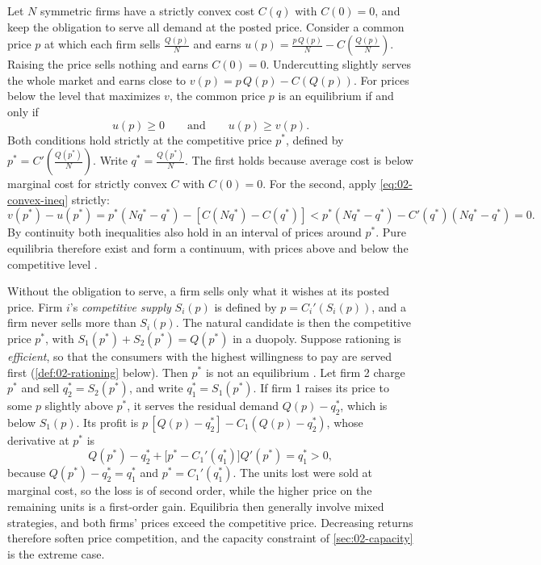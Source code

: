 \begin{remark}\label{rem:02-bertrand-convex}
Let $N$ symmetric firms have a strictly convex cost $C(q)$ with $C(0) = 0$, and keep the obligation to serve all
demand at the posted price. Consider a common price $p$ at which each firm sells $\frac{Q(p)}{N}$ and earns
$u(p) = \frac{p\, Q(p)}{N} - C\left(\frac{Q(p)}{N}\right)$. Raising the price sells nothing and earns $C(0) = 0$.
Undercutting slightly serves the whole market and earns close to $v(p) = p\, Q(p) - C(Q(p))$. For prices below the
level that maximizes $v$, the common price $p$ is an equilibrium if and only if
\begin{equation*}
u(p) \ge 0 \qquad\text{and}\qquad u(p) \ge v(p) .
\end{equation*}
Both conditions hold strictly at the competitive price $p^*$, defined by $p^* = C'\left(\frac{Q(p^*)}{N}\right)$.
Write $q^* = \frac{Q(p^*)}{N}$. The first holds because average cost is below marginal cost for strictly convex $C$
with $C(0) = 0$. For the second, apply \eqref{eq:02-convex-ineq} strictly:
\begin{equation*}
v(p^*) - u(p^*) = p^*\left(Nq^* - q^*\right) - \left[C(Nq^*) - C(q^*)\right]
< p^*\left(Nq^* - q^*\right) - C'(q^*)\left(Nq^* - q^*\right) = 0 .
\end{equation*}
By continuity both inequalities also hold in an interval of prices around $p^*$. Pure equilibria therefore exist and
form a continuum, with prices above and below the competitive level \citep{Dastidar1995}.

Without the obligation to serve, a firm sells only what it wishes at its posted price. Firm $i$'s \emph{competitive
supply} $S_i(p)$ is defined by $p = C_i'(S_i(p))$, and a firm never sells more than $S_i(p)$. The natural candidate is
then the competitive price $p^*$, with $S_1(p^*) + S_2(p^*) = Q(p^*)$ in a duopoly. Suppose rationing is
\emph{efficient}, so that the consumers with the highest willingness to pay are served first (\cref{def:02-rationing}
below). Then $p^*$ is not an equilibrium \citep[sec.~5.3.2]{Tirole1988}. Let firm 2 charge $p^*$ and sell
$q_2^* = S_2(p^*)$, and write $q_1^* = S_1(p^*)$. If firm 1 raises its price to some $p$ slightly above $p^*$, it
serves the residual demand $Q(p) - q_2^*$, which is below $S_1(p)$. Its profit is
$p\,[Q(p) - q_2^*] - C_1(Q(p) - q_2^*)$, whose derivative at $p^*$ is
\begin{equation*}
Q(p^*) - q_2^* + \bigl[p^* - C_1'(q_1^*)\bigr]Q'(p^*) = q_1^* > 0 ,
\end{equation*}
because $Q(p^*) - q_2^* = q_1^*$ and $p^* = C_1'(q_1^*)$. The units lost were sold at marginal cost, so the loss is of
second order, while the higher price on the remaining units is a first-order gain. Equilibria then generally involve
mixed strategies, and both firms' prices exceed the competitive price. Decreasing returns therefore soften price
competition, and the capacity constraint of \cref{sec:02-capacity} is the extreme case.
\end{remark}

